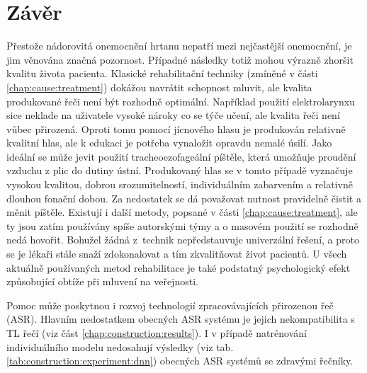 \chapter{Závěr}
\label{chap:conclusion}

Přestože nádorovitá onemocnění hrtanu nepatří mezi nejčastější onemocnění, je
jim věnována značná pozornost. Případné následky totiž mohou výrazně zhoršit
kvalitu života pacienta. Klasické rehabilitační techniky (zmíněné v části
\ref{chap:cause:treatment}) dokážou navrátit schopnost mluvit, ale kvalita
produkované řeči není být rozhodně optimální. Například použití
elektrolarynxu sice neklade na uživatele vysoké nároky co se týče učení, ale
kvalita řeči není vůbec přirozená. Oproti tomu pomocí jícnového hlasu je
produkován relativně kvalitní hlas, ale k edukaci je potřeba vynaložit opravdu
nemalé úsilí. Jako ideální se může jevit použití tracheoezofageální píštěle,
která umožňuje proudění vzduchu z plic do dutiny ústní. Produkovaný hlas se v
tomto případě vyznačuje vysokou kvalitou, dobrou srozumitelností,
individuálním zabarvením a relativně dlouhou fonační dobou. Za nedostatek se
dá považovat nutnost pravidelně čistit a měnit píštěle. Existují i další
metody, popsané v části \ref{chap:cause:treatment}, ale ty jsou zatím používány
spíše autorskými týmy a o masovém použití se rozhodně nedá hovořit. Bohužel
žádná z~technik nepředstauvuje univerzální řešení, a proto se je lékaři
stále snaží zdokonalovat a tím zkvalitňovat život pacientů. U všech aktuálně používaných metod rehabilitace je také podstatný psychologický efekt způsobující obtíže při mluvení na veřejnosti.

Pomoc může poskytnou i rozvoj technologií zpracovávajících přirozenou řeč (ASR). Hlavním nedostatkem obecných ASR systému je jejich nekompatibilita s TL řečí (viz část \ref{chap:construction:results}). I v případě natrénování individuálního modelu nedosahují výsledky (viz tab. \ref{tab:construction:experiment:dnn}) obecných ASR systémů se zdravými řečníky.


